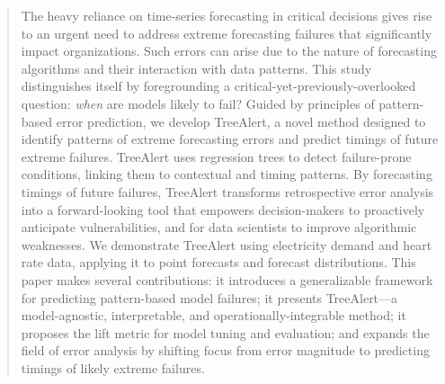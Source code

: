 \documentclass[12pt]{article}
\begin{document}
\bigskip
\begin{abstract} %
The heavy reliance on time-series forecasting in critical decisions gives rise to an urgent need to address extreme forecasting failures that significantly impact organizations. Such errors can arise due to the nature of forecasting algorithms and their interaction with data patterns. This study distinguishes itself by foregrounding a critical-yet-previously-overlooked question: \emph{when} are models likely to fail? Guided by principles of pattern-based error prediction, we develop TreeAlert, a novel method designed to identify patterns of extreme forecasting errors and predict timings of future extreme failures. TreeAlert uses regression trees to detect failure-prone conditions, linking them to contextual and timing patterns. By forecasting timings of future failures, TreeAlert transforms retrospective error analysis into a forward-looking tool that empowers decision-makers to proactively anticipate vulnerabilities, and for data scientists to improve algorithmic weaknesses. We demonstrate TreeAlert using electricity demand and heart rate data, applying it to point forecasts and forecast distributions. This paper makes several contributions: it introduces a generalizable framework for predicting pattern-based model failures; it presents TreeAlert---a model-agnostic, interpretable, and operationally-integrable method; it proposes the lift metric for model tuning and evaluation; and expands the field of error analysis by shifting focus from error magnitude to predicting timings of likely extreme failures.

\end{abstract}
\end{document}
